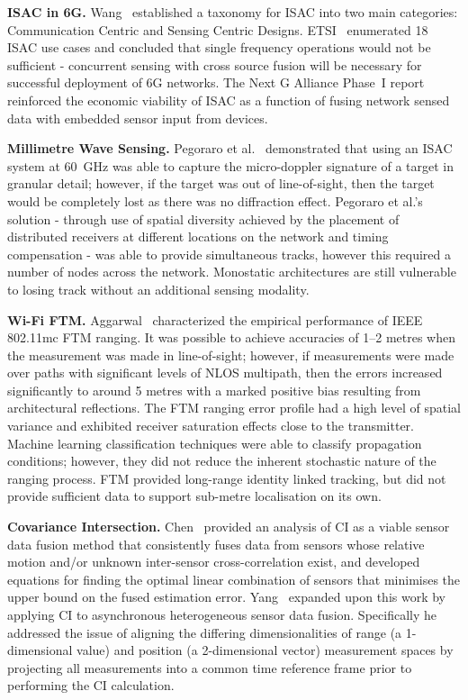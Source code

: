 \textbf{ISAC in 6G.} Wang~\cite{wang_isac} established a taxonomy for ISAC into two main categories: Communication Centric and Sensing Centric Designs. ETSI~\cite{etsi_isc_001} enumerated 18 ISAC use cases and concluded that single frequency operations would not be sufficient - concurrent sensing with cross source fusion will be necessary for successful deployment of 6G networks. The Next G Alliance Phase~I report~\cite{nextg_phase1} reinforced the economic viability of ISAC as a function of fusing network sensed data with embedded sensor input from devices.

\textbf{Millimetre Wave Sensing.} Pegoraro et al.~\cite{pegoraro_asymov} demonstrated that using an ISAC system at 60~GHz was able to capture the micro-doppler signature of a target in granular detail; however, if the target was out of line-of-sight, then the target would be completely lost as there was no diffraction effect. Pegoraro et al.'s~\cite{pegoraro_asymov} solution - through use of spatial diversity achieved by the placement of distributed receivers at different locations on the network and timing compensation - was able to provide simultaneous tracks, however this required a number of nodes across the network. Monostatic architectures are still vulnerable to losing track without an additional sensing modality.

\textbf{Wi-Fi FTM.} Aggarwal~\cite{aggarwal_wifi} characterized the empirical performance of IEEE 802.11mc FTM ranging. It was possible to achieve accuracies of 1--2 metres when the measurement was made in line-of-sight; however, if measurements were made over paths with significant levels of NLOS multipath, then the errors increased significantly to around 5 metres with a marked positive bias resulting from architectural reflections. The FTM ranging error profile had a high level of spatial variance and exhibited receiver saturation effects close to the transmitter. Machine learning classification techniques were able to classify propagation conditions; however, they did not reduce the inherent stochastic nature of the ranging process. FTM provided long-range identity linked tracking, but did not provide sufficient data to support sub-metre localisation on its own.

\textbf{Covariance Intersection.} Chen~\cite{chen_ci} provided an analysis of CI as a viable sensor data fusion method that consistently fuses data from sensors whose relative motion and/or unknown inter-sensor cross-correlation exist, and developed equations for finding the optimal linear combination of sensors that minimises the upper bound on the fused estimation error. Yang~\cite{yang_heterogeneous} expanded upon this work by applying CI to asynchronous heterogeneous sensor data fusion. Specifically he addressed the issue of aligning the differing dimensionalities of range (a 1-dimensional value) and position (a 2-dimensional vector) measurement spaces by projecting all measurements into a common time reference frame prior to performing the CI calculation.

